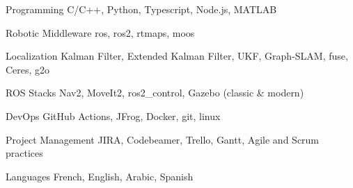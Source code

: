 

\begin{cvskills}

  \cvskill
    {Programming} %
    {C/C++, Python, Typescript, Node.js, MATLAB} %

  \cvskill
    {Robotic Middleware} %
    {ros, ros2, rtmaps, moos} %

  \cvskill
    {Localization} %
    {Kalman Filter, Extended Kalman Filter, UKF, Graph-SLAM, fuse, Ceres, g2o} %

  \cvskill
    {ROS Stacks} %
    {Nav2, MoveIt2, ros2\_control, Gazebo (classic \& modern)} %

  \cvskill
    {DevOps} %
    {GitHub Actions, JFrog, Docker, git, linux} %

  \cvskill
    {Project Management} %
    {JIRA, Codebeamer, Trello, Gantt, Agile and Scrum practices} %
 
  \cvskill
    {Languages} %
    {French, English, Arabic, Spanish} %

\end{cvskills}
